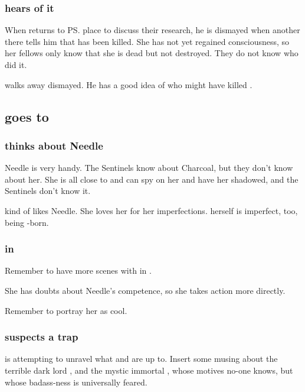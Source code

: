 \subsubsection{\Teshrial{} hears of it}
When \Teshrial{} returns to \ps{\Urizeth} place to discuss their research, he is dismayed when another \resphan{} there tells him that \Urizeth{} has been killed. 
She has not yet regained consciousness, so her fellows only know that she is dead but not destroyed. 
They do not know who did it. 

\Teshrial{} walks away dismayed. 
He has a good idea of who might have killed \Urizeth{}. 









\subsection{\Achsah goes to \Forclin}





\subsubsection{\Achsah{} thinks about Needle}
Needle is very handy. 
The Sentinels know about Charcoal, but they don't know about her. 
She is all close to \Tiroco{} and can spy on her and have her shadowed, and the Sentinels don't know it. 

\Achsah{} kind of likes Needle. 
She loves her for her imperfections. 
\Achsah{} herself is imperfect, too, being \bezed-born. 




\subsubsection{\Achsah{} in \Malcur}
Remember to have more scenes with \Achsah{} in \Malcur. 

She has doubts about Needle's competence, so she takes action more directly. 

Remember to portray her as cool. 





\subsubsection{\Achsah{} suspects a trap}
\Achsah{} is attempting to unravel what \Ishnaruchaefir{} and \Secherdamon{} are up to. 
Insert some musing about the terrible dark lord \Secherdamon, and the mystic immortal \Ishnaruchaefir, whose motives no-one knows, but whose badass-ness is universally feared. 

